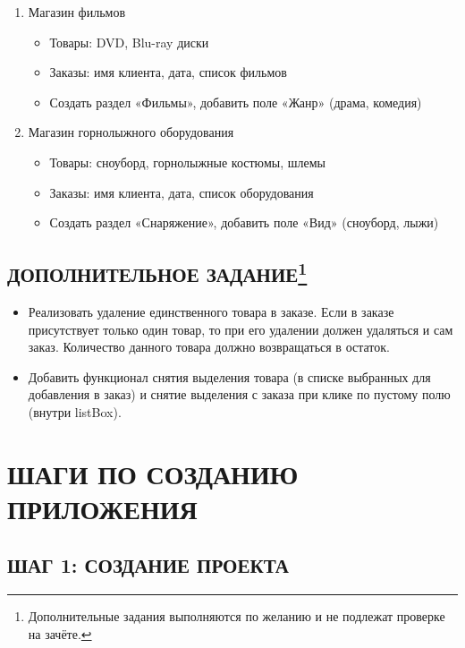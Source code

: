 \documentclass[12pt]{article}
\renewcommand{\texttt}[1]{{\small\ttfamily #1}}
\numberwithin{listing}{section}
\numberwithin{figure}{section}
\begin{document}
\begin{enumerate}
\newpage

\item Магазин фильмов
\begin{itemize}
	\item Товары: DVD, Blu-ray диски
	\item Заказы: имя клиента, дата, список фильмов
	\item Создать раздел «Фильмы», добавить поле «Жанр» (драма, комедия)
\end{itemize}

\item Магазин горнолыжного оборудования
\begin{itemize}
	\item Товары: сноуборд, горнолыжные костюмы, шлемы
	\item Заказы: имя клиента, дата, список оборудования
	\item Создать раздел «Снаряжение», добавить поле «Вид» (сноуборд, лыжи)
\end{itemize}

\end{enumerate}

\subsection
[ДОПОЛНИТЕЛЬНОЕ ЗАДАНИЕ~]
{ДОПОЛНИТЕЛЬНОЕ ЗАДАНИЕ\protect\footnote{Дополнительные задания выполняются по желанию и не подлежат проверке на зачёте.}}

\begin{itemize}
	\item Реализовать удаление единственного товара в заказе. Если в заказе присутствует только один товар, то при его удалении должен удаляться и сам заказ. Количество данного товара должно возвращаться в остаток.

	\item Добавить функционал снятия выделения товара (в списке выбранных для добавления в заказ) и снятие выделения с заказа при клике по пустому полю (внутри \texttt{listBox}).

\end{itemize}


\newpage

\section{ШАГИ ПО СОЗДАНИЮ ПРИЛОЖЕНИЯ}

\subsection{ШАГ 1: СОЗДАНИЕ ПРОЕКТА}
\end{document}
